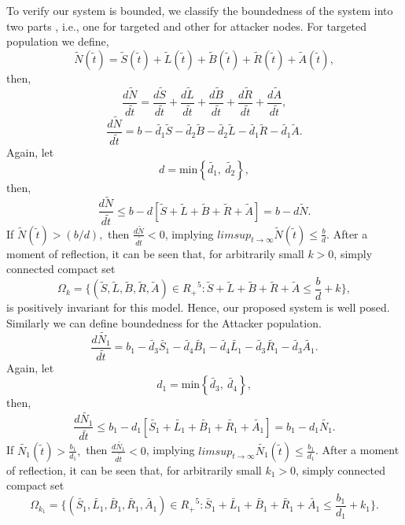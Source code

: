 To verify our system is bounded, we classify the boundedness of the system into two parts , i.e., one for targeted  and other for attacker nodes.
For targeted population we define,
$$\tilde{N}(\tilde{t}) = \tilde{S}(\tilde{t}) + \tilde{L}(\tilde{t}) + \tilde{B}(\tilde{t}) + \tilde{R}(\tilde{t}) + \tilde{A}(\tilde{t}),$$
then,
$$\frac{d\tilde{N}}{d\tilde{t}}=\frac{d\tilde{S}}{d\tilde{t}}+\frac{d\tilde{L}}{d\tilde{t}}+\frac{d\tilde{B}}{d\tilde{t}}+\frac{d\tilde{R}}{d\tilde{t}}+\frac{d\tilde{A}}{d\tilde{t}},$$
$$\frac{d\tilde{N}}{d\tilde{t}}=b - \tilde{d_1}\tilde{S}-\tilde{d_2}\tilde{B}-\tilde{d_2}\tilde{L}-\tilde{d_1}\tilde{R}-\tilde{d_1}\tilde{A}.$$
Again, let
$$d =  {\text{min} \left\{\tilde{d_1},\ \tilde{d_2}\right\}},$$ then,
$$\frac{d\tilde{N}}{d\tilde{t}}\leq b- d[\tilde{S} + \tilde{L} + \tilde{B} + \tilde{R} + \tilde{A}]=b-d\tilde{N}.$$
If $\tilde{N}(\tilde{t}) > (b/d),$ then $\frac{d\tilde{N}}{d\tilde{t}} < 0$, implying $lim sup_{t \to \infty} \tilde{N}(\tilde{t}) \leq \frac{b}{d}$. After a moment of reflection, it can be seen that, for arbitrarily small $k>0$, simply connected compact set
$${\Omega}_k = \{(\tilde{S}, \tilde{L}, \tilde{B}, \tilde{R}, \tilde{A}) \in {R_{+}}^5: \tilde{S} + \tilde{L} + \tilde{B} + \tilde{R} + \tilde{A} \leq \frac{b}{d} + k\},$$
is positively invariant for this model. Hence, our proposed system is well posed. \\
Similarly we can define boundedness for the Attacker population.
$$\frac{d\tilde{N_1}}{d\tilde{t}}=b_{1} - \tilde{d_3}\tilde{S_{1}}-\tilde{d_{4}}\tilde{B_{1}}-\tilde{d_{4}}\tilde{L_{1}}-\tilde{d_{3}}\tilde{R_{1}}-\tilde{d_{3}}\tilde{A_{1}}.$$
Again, let
$$d_{1} =  {\text{min} \left\{\tilde{d_3},\ \tilde{d_4}\right\}},$$ then,
$$\frac{d\tilde{N_{1}}}{d\tilde{t}}\leq b_{1}- d_{1}[\tilde{S_{1}} + \tilde{L_{1}} + \tilde{B_{1}} + \tilde{R_{1}} + \tilde{A_{1}}]=b_{1}-d_{1}\tilde{N_{1}}.$$
If $\tilde{N_1}(\tilde{t}) > \frac{b_1}{d_1},$ then $\frac{d\tilde{N_1}}{d\tilde{t}} < 0$, implying $lim sup_{t \to \infty} \tilde{N_1}(\tilde{t}) \leq \frac{b_1}{d_1}$. After a moment of reflection, it can be seen that, for arbitrarily small $k_1>0$, simply connected compact set
$${\Omega}_{k_1} = \{(\tilde{S_{1}}, \tilde{L_{1}}, \tilde{B_{1}}, \tilde{R_{1}}, \tilde{A_{1}}) \in {R_{+}}^5: \tilde{S_{1}} + \tilde{L_{1}} + \tilde{B_{1}} + \tilde{R_{1}} + \tilde{A_{1}} \leq \frac{b_{1}}{d_{1}} + k_{1}\}.$$


































